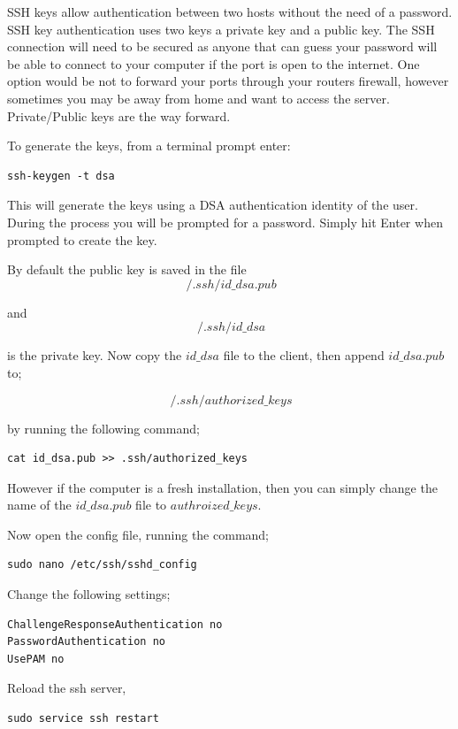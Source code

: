 SSH keys allow authentication between two hosts without the need of a password. SSH key authentication uses two keys a private key and a public key.  The SSH connection will need to be secured as anyone that can guess your password will be able to connect to your computer if the port is open to the internet.  One option would be not to forward your ports through your routers firewall, however sometimes you may be away from home and want to access the server.  Private/Public keys are the way forward.


To generate the keys, from a terminal prompt enter:

\begin{lstlisting}
ssh-keygen -t dsa
\end{lstlisting}

This will generate the keys using a DSA authentication identity of the user. During the process you will be prompted for a password. Simply hit Enter when prompted to create the key.

By default the public key is saved in the file
$$
 ~/.ssh/id\_dsa.pub
$$

and
$$
 ~/.ssh/id\_dsa
$$

is the private key. Now copy the $id\_dsa$ file to the client, then append $id\_dsa.pub$ to;

$$
~/.ssh/authorized\_keys
$$

by running the following command;

\begin{lstlisting}
cat id_dsa.pub >> .ssh/authorized_keys
\end{lstlisting}

However if the computer is a fresh installation, then you can simply change the name of the $id\_dsa.pub$ file to $authroized\_keys$.

Now open the config file, running the command;

\begin{lstlisting}
sudo nano /etc/ssh/sshd_config
\end{lstlisting}

Change the following settings;

\begin{lstlisting}
ChallengeResponseAuthentication no
PasswordAuthentication no
UsePAM no
\end{lstlisting}

Reload the ssh server,

\begin{lstlisting}
sudo service ssh restart
\end{lstlisting}

